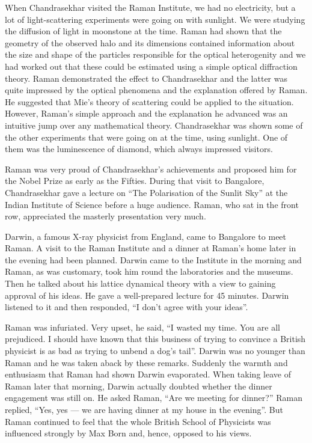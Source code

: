 When Chandrasekhar visited the Raman Institute, we had
no electricity, but a lot of light-scattering experiments were going
on with sunlight. We were studying the diffusion of light in
moonstone at the time. Raman had shown that the geometry of
the observed halo and its dimensions contained information about
the size and shape of the particles responsible for the optical
heterogenity and we had worked out that these could be estimated
using a simple optical diffraction theory. Raman demonstrated
the effect to Chandrasekhar and the latter was quite impressed
by the optical phenomena and the explanation offered by Raman.
He suggested that Mie's theory of scattering could be applied to
the situation. However, Raman's simple approach and the
explanation he advanced was an intuitive jump over any
mathematical theory. Chandrasekhar was shown some of the
other experiments that were going on at the time, using sunlight.
One of them was the luminescence of diamond, which always
impressed visitors.

Raman was very proud of Chandrasekhar's achievements
and proposed him for the Nobel Prize as early as the Fifties.
During that visit to Bangalore, Chandrasekhar gave a lecture on
``The Polarisation of the Sunlit Sky'' at the Indian Institute of
Science before a huge audience. Raman, who sat in the front row,
appreciated the masterly presentation very much.

\medskip
{}
\smallskip

\noindent
Darwin, a famous X-ray physicist from England, came to
Bangalore to meet Raman. A visit to the Raman Institute and
a dinner at Raman's home later in the evening had been planned.
Darwin came to the Institute in the morning and Raman, as was
customary, took him round the laboratories and the museums.
Then he talked about his lattice dynamical theory with a view
to gaining approval of his ideas. He gave a well-prepared lecture
for 45 minutes. Darwin listened to it and then responded, ``I don't
agree with your ideas''.

Raman was infuriated. Very upset, he said, ``I wasted my
time. You are all prejudiced. I should have known that this
business of trying to convince a British physicist is as bad as trying
to unbend a dog's tail''. Darwin was no younger than Raman
and he was taken aback by these remarks. Suddenly the warmth
and enthusiasm that Raman had shown Darwin evaporated.
When taking leave of Raman later that morning, Darwin actually
doubted whether the dinner engagement was still on. He asked
Raman, ``Are we meeting for dinner?'' Raman replied,
``Yes, yes --- we are having dinner at my house in the evening''.
But Raman continued to feel that the whole British School of
Physicists was influenced strongly by Max Born and, hence,
opposed to his views.

